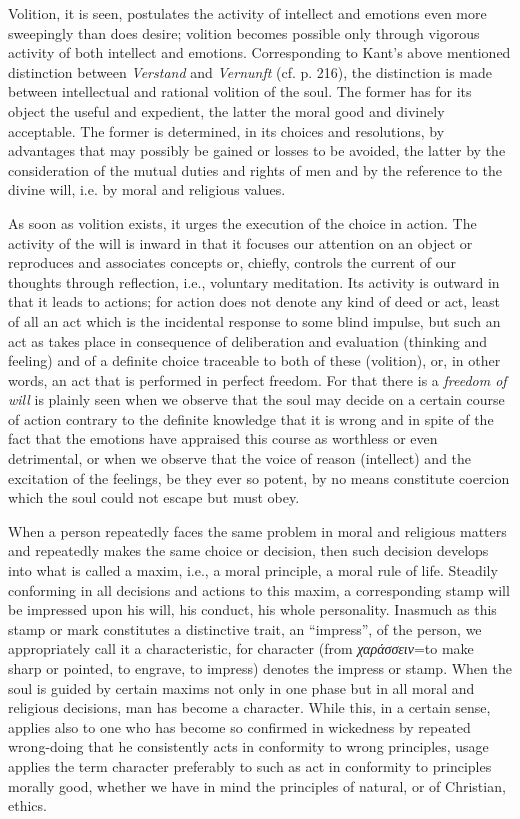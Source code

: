Volition, it is seen, postulates the activity of intellect and emotions even more sweepingly than does desire; volition becomes possible only through vigorous activity of both intellect and emotions. Corresponding to Kant’s above mentioned distinction between \emph{Verstand} and \emph{Vernunft} (cf. p. 216), the distinction is made between intellectual and rational volition of the soul. The former has for its object the useful and expedient, the latter the moral good and divinely acceptable. The former is determined, in its choices and resolutions, by advantages that may possibly be gained or losses to be avoided, the latter by the consideration of the mutual duties and rights of men and by the reference to the divine will, i.e. by moral and religious values.

As soon as volition exists, it urges the execution of the choice in action. The activity of the will is inward in that it focuses our attention on an object or reproduces and associates concepts or, chiefly, controls the current of our thoughts through reflection, i.e., voluntary meditation. Its
activity is outward in that it leads to actions; for action does not denote any kind of deed or act, least of all an act which is the incidental response to some blind impulse, but such an act as takes place in consequence of deliberation and evaluation (thinking and feeling) and of a definite choice traceable to both of these (volition), or, in other words, an act that is performed in perfect freedom. For that there is a \emph{freedom of will} is plainly seen when we observe that the soul may decide on a certain course of action contrary to the definite knowledge that it is wrong and in spite of the fact that the emotions have appraised this course as worthless or even detrimental, or when we observe that the voice of reason (intellect) and the excitation of the feelings, be they ever so potent, by no means constitute coercion which the soul could not escape but must obey.

When a person repeatedly faces the same problem in moral and religious matters and repeatedly makes the same choice or decision, then such decision develops into what is called a maxim, i.e., a moral principle, a moral rule of life. Steadily conforming in all decisions and actions to this maxim, a corresponding stamp will be impressed upon his will, his conduct, his whole personality. Inasmuch as this stamp or mark constitutes a distinctive trait, an “impress”, of the person, we appropriately call it a characteristic, for character (from \emph{χαράσσειν}=to make sharp or pointed, to engrave, to impress) denotes the impress or stamp. When the soul is guided by certain maxims not only in one phase but in all moral and religious decisions, man has become a character. While this, in a certain sense, applies also to one who has become so confirmed in wickedness by repeated wrong-doing that he consistently acts in conformity to wrong principles, usage applies the term character preferably to such as act in conformity to principles morally good, whether we have in mind the principles of natural, or of Christian, ethics.

